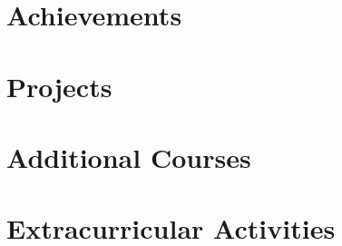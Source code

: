 \documentclass[letterpaper, 10pt]{article}
\begin{document}
\section{Achievements}
\label{achievements}




\section{Projects}
\label{projects}








\section{Additional Courses}




\section{Extracurricular Activities}


\end{document}
